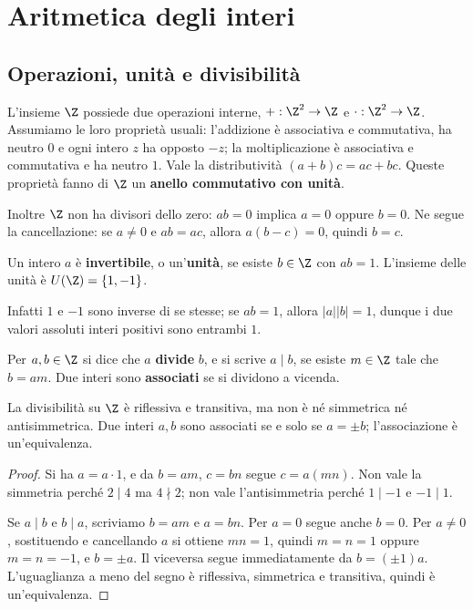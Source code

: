 \chapter{Aritmetica degli interi}\label{cap:interi}

\section{Operazioni, unità e divisibilità}
L'insieme $\Z$ possiede due operazioni interne, $+:\Z^2\to\Z$ e $\cdot:\Z^2\to\Z$. Assumiamo le loro proprietà usuali: l'addizione è associativa e commutativa, ha neutro $0$ e ogni intero $z$ ha opposto $-z$; la moltiplicazione è associativa e commutativa e ha neutro $1$. Vale la distributività $(a+b)c=ac+bc$. Queste proprietà fanno di $\Z$ un \textbf{anello commutativo con unità}.

Inoltre $\Z$ non ha divisori dello zero: $ab=0$ implica $a=0$ oppure $b=0$. Ne segue la cancellazione: se $a\ne0$ e $ab=ac$, allora $a(b-c)=0$, quindi $b=c$.

\begin{definizione}
Un intero $a$ è \textbf{invertibile}, o un'\textbf{unità}, se esiste $b\in\Z$ con $ab=1$. L'insieme delle unità è $U(\Z)=\{1,-1\}$.
\end{definizione}
Infatti $1$ e $-1$ sono inverse di se stesse; se $ab=1$, allora $|a||b|=1$, dunque i due valori assoluti interi positivi sono entrambi $1$.

\begin{definizione}
Per $a,b\in\Z$ si dice che $a$ \textbf{divide} $b$, e si scrive $a\mid b$, se esiste $m\in\Z$ tale che $b=am$. Due interi sono \textbf{associati} se si dividono a vicenda.
\end{definizione}

\begin{proposizione}
La divisibilità su $\Z$ è riflessiva e transitiva, ma non è né simmetrica né antisimmetrica. Due interi $a,b$ sono associati se e solo se $a=\pm b$; l'associazione è un'equivalenza.
\end{proposizione}
\begin{proof}
Si ha $a=a\cdot1$, e da $b=am$, $c=bn$ segue $c=a(mn)$. Non vale la simmetria perché $2\mid4$ ma $4\nmid2$; non vale l'antisimmetria perché $1\mid-1$ e $-1\mid1$.

Se $a\mid b$ e $b\mid a$, scriviamo $b=am$ e $a=bn$. Per $a=0$ segue anche $b=0$. Per $a\ne0$, sostituendo e cancellando $a$ si ottiene $mn=1$, quindi $m=n=1$ oppure $m=n=-1$, e $b=\pm a$. Il viceversa segue immediatamente da $b=(\pm1)a$. L'uguaglianza a meno del segno è riflessiva, simmetrica e transitiva, quindi è un'equivalenza.
\end{proof}


